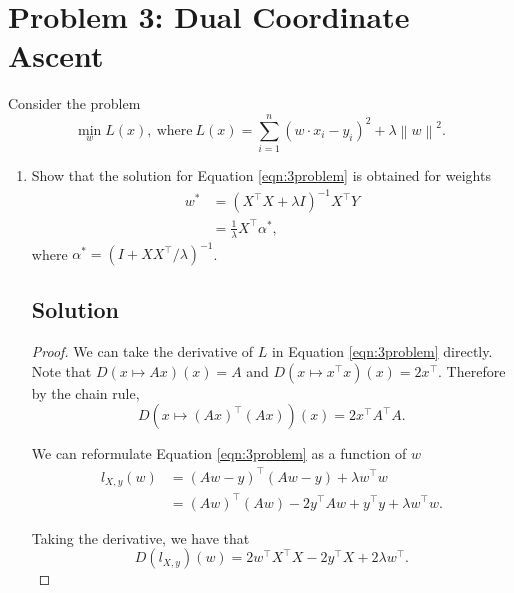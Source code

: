 \section*{Problem 3: Dual Coordinate Ascent}

Consider the problem
\begin{equation}
  \min_w L\left(x\right),~\text{where}~
  L\left(x\right) = \sum_{i=1}^n\left(w \cdot x_i - y_i\right)^2 + \lambda \left\lVert
    w
  \right\rVert^2.
  \label{eqn:3problem}
\end{equation}

\begin{enumerate}
\item 
  Show that the solution for Equation \ref{eqn:3problem} is obtained for weights
  \begin{align}
    w^* &= \left(X^\intercal X +\lambda I\right)^{-1}X^\intercal Y \label{eqn:3w_star} \\
    &= \frac{1}{\lambda}X^\intercal\alpha^*, \label{eqn:3w_star2}
  \end{align}
  where $\alpha^* = \left(I + XX^\intercal/\lambda\right)^{-1}$.

  \subsection*{Solution}
  \begin{proof}
    We can take the derivative of $L$ in Equation \ref{eqn:3problem}
    directly. Note that $D\left(x \mapsto Ax\right)\left(x\right) = A$ and
    $D\left(x \mapsto x^\intercal x\right)\left(x\right) = 2x^\intercal.$
    Therefore by the chain rule,
    \begin{equation}
      D\left(x \mapsto \left(Ax\right)^\intercal\left(Ax\right)\right)(x)
      = 2 x^\intercal A^\intercal A.
    \end{equation}

    We can reformulate Equation \ref{eqn:3problem} as a function of $w$
    \begin{align}
      l_{X,y}\left(w\right)
      &= \left(Aw - y\right)^\intercal\left(Aw - y\right) + \lambda w^\intercal w \nonumber\\
      &=
        \left(Aw\right)^\intercal\left(Aw\right)
        - 2y^\intercal Aw + y^\intercal y
        + \lambda w^\intercal w.
        \label{eqn:3problem_new}
    \end{align}

    Taking the derivative, we have that
    \begin{equation}
      D\left(l_{X,y}\right)(w)
      = 2 w^\intercal X^\intercal X - 2 y^\intercal X + 2\lambda w^\intercal.
      \label{eqn:3derivative}
    \end{equation}


\end{proof}
\end{enumerate}
